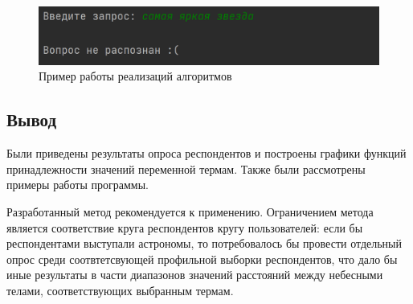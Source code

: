 \begin{figure}[h!btp]
	\centering
	\includegraphics[width=420pt]{inc/output4.png}
	\caption{Пример работы реализаций алгоритмов}
	\label{fig:output}	
\end{figure}

\vspace{\baselineskip}
\subsection*{Вывод}
\vspace{\baselineskip}

Были приведены результаты опроса респондентов и построены графики функций принадлежности значений переменной термам. Также были рассмотрены примеры работы программы.

Разработанный метод рекомендуется к применению. Ограничением метода является соответствие круга респондентов кругу пользователей: если бы респондентами выступали астрономы, то потребовалось бы провести отдельный опрос среди соотвтетсвующей профильной выборки респондентов, что дало бы иные результаты в части диапазонов значений расстояний между небесными телами, соответствующих выбранным термам. 
